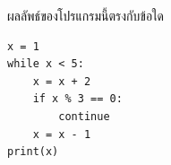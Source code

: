 ﻿%
\question ผลลัพธ์ของโปรแกรมนี้ตรงกับข้อใด
\begin{verbatim}
x = 1
while x < 5:
    x = x + 2
    if x % 3 == 0:
        continue
    x = x - 1
print(x)
\end{verbatim}
